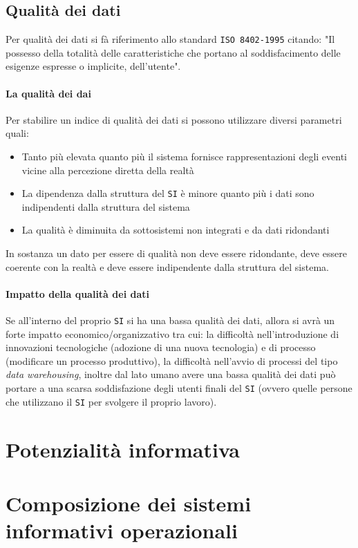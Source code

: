    \subsection{Qualità dei dati}
        Per qualità dei dati si fà riferimento allo standard \texttt{ISO 8402-1995} citando: "Il possesso della totalità delle caratteristiche che portano al soddisfacimento delle esigenze espresse o implicite, dell'utente".
        \paragraph{La qualità dei dai}
            Per stabilire un indice di qualità dei dati si possono utilizzare diversi parametri quali:
            \begin{itemize}
                \item Tanto più elevata quanto più il sistema fornisce rappresentazioni degli eventi vicine alla percezione diretta della realtà
                \item La dipendenza dalla struttura del \texttt{SI} è minore quanto più i dati sono indipendenti dalla struttura del sistema
                \item La qualità è diminuita da sottosistemi non integrati e da dati ridondanti
            \end{itemize}
            In sostanza un dato per essere di qualità non deve essere ridondante, deve essere coerente con la realtà e deve essere indipendente dalla struttura del sistema.
        \paragraph{Impatto della qualità dei dati}
            Se all'interno del proprio \texttt{SI} si ha una bassa qualità dei dati, allora si avrà un forte impatto economico/organizzativo tra cui: la difficoltà nell'introduzione di innovazioni tecnologiche (adozione di una nuova tecnologia) e di processo (modificare un processo produttivo), la difficoltà nell'avvio di processi del tipo \textit{data warehousing}, inoltre dal lato umano avere una bassa qualità dei dati può portare a una scarsa soddisfazione degli utenti finali del \texttt{SI} (ovvero quelle persone che utilizzano il \texttt{SI} per svolgere il proprio lavoro).
\section{Potenzialità informativa}
\section{Composizione dei sistemi informativi operazionali}
